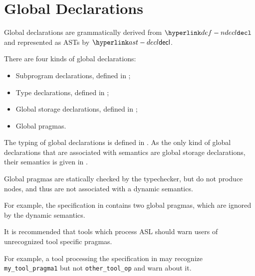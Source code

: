 \chapter{Global Declarations\label{chap:GlobalDeclarations}}
\hypertarget{def-globaldeclarationterm}{}
Global declarations are grammatically derived from $\Ndecl$ and represented as ASTs by $\decl$.

There are four kinds of global declarations:
\begin{itemize}
  \item Subprogram declarations, defined in ;
  \item Type declarations, defined in ;
  \item Global storage declarations, defined in ;
  \item Global pragmas.
\end{itemize}

The typing of global declarations is defined in .
As the only kind of global declarations that are associated with semantics are global storage declarations,
their semantics is given in .

Global pragmas are statically checked by the typechecker, but do not produce \typedast{} nodes,
and thus are not associated with a dynamic semantics.

For example, the specification in  contains two global pragmas,
which are ignored by the dynamic semantics.

It is recommended that tools which process ASL should warn users of unrecognized tool specific pragmas.

For example, a tool processing the specification in  may recognize \verb|my_tool_pragma1|
but not \verb|other_tool_op| and warn about it.

